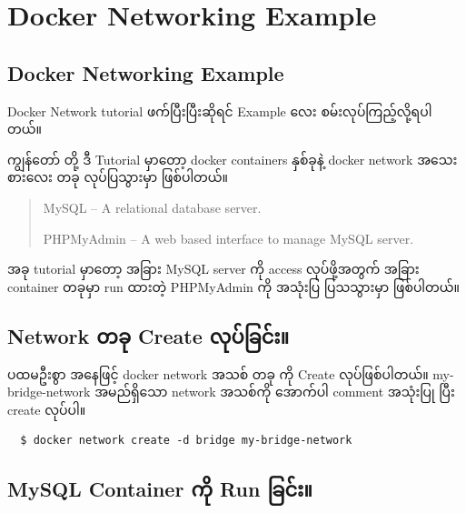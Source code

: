 \documentclass[]{article}
\begin{document}
\pagebreak

\hypertarget{docker-networking-example}{%
\section{Docker Networking Example}\label{docker-networking-example}}

\hypertarget{docker-networking-example-1}{%
\subsection{Docker Networking
Example}\label{docker-networking-example-1}}

Docker Network tutorial ဖက်ပြီးပြီးဆိုရင် Example လေး
စမ်းလုပ်ကြည့်လို့ရပါတယ်။

ကျွန်တော် တို့ ဒီ Tutorial မှာတော့ docker containers နှစ်ခုနဲ့ docker
network အသေးစားလေး တခု လုပ်ပြသွားမှာ ဖြစ်ပါတယ်။

\begin{quote}
MySQL -- A relational database server.

PHPMyAdmin -- A web based interface to manage MySQL server.
\end{quote}

အခု tutorial မှာတော့ အခြား MySQL server ကို access လုပ်ဖို့အတွက် အခြား
container တခုမှာ run ထားတဲ့ PHPMyAdmin ကို အသုံးပြ ပြသသွားမှာ ဖြစ်ပါတယ်။

\hypertarget{network-ux1010ux1001ux102f-create-ux101cux102fux1015ux103aux1001ux103cux1004ux103aux1038}{%
\subsection{Network တခု Create
လုပ်ခြင်း။}\label{network-ux1010ux1001ux102f-create-ux101cux102fux1015ux103aux1001ux103cux1004ux103aux1038}}

ပထမဦးစွာ အနေဖြင့် docker network အသစ် တခု ကို Create လုပ်ဖြစ်ပါတယ်။
my-bridge-network အမည်ရှိသော network အသစ်ကို အောက်ပါ comment အသုံးပြု
ပြီး create လုပ်ပါ။

\begin{verbatim}
  $ docker network create -d bridge my-bridge-network
\end{verbatim}

\hypertarget{mysql-container-ux1000ux102dux102f-run-ux1001ux103cux1004ux103aux1038}{%
\subsection{MySQL Container ကို Run
ခြင်း။}\label{mysql-container-ux1000ux102dux102f-run-ux1001ux103cux1004ux103aux1038}}
\end{document}
